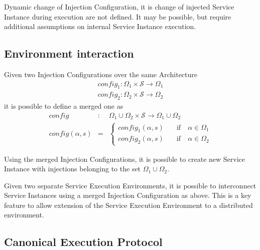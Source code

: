 Dynamic change of Injection Configuration, it is change of injected Service Instance during execution are not defined. It may be possible, but require additional assumptions on internal Service Instance execution.

\subsection{Environment interaction}

Given two Injection Configurations over the same Architecture
\begin{eqnarray}
config_1 : \Omega_1 \times \mathcal{S} \rightarrow \Omega_1 \nonumber \\
config_2 : \Omega_2 \times \mathcal{S} \rightarrow \Omega_2 \nonumber 
\end{eqnarray}
it is possible to define a merged one as
\begin{eqnarray}
config &:& \Omega_1 \cup \Omega_2 \times \mathcal{S} \rightarrow \Omega_1 \cup \Omega_2 \nonumber \\
config(\alpha,s) &=& \left\{\begin{aligned}
         config_1(\alpha,s) & \quad \text{if} \quad \alpha \in \Omega_1\\
         config_2(\alpha,s) & \quad \text{if} \quad \alpha \in \Omega_2
       \end{aligned}\right. \nonumber
\end{eqnarray}

Using the merged Injection Configurations, it is possible to create new Service Instance with injections belonging to the set $\Omega_1\cup\Omega_2$.

Given two separate Service Execution Environments, it is possible to interconnect Service Instances using a merged Injection Configuration as above. This is a key feature to allow extension of the Service Execution Environment to a distributed environment.

\subsection{Canonical Execution Protocol}


